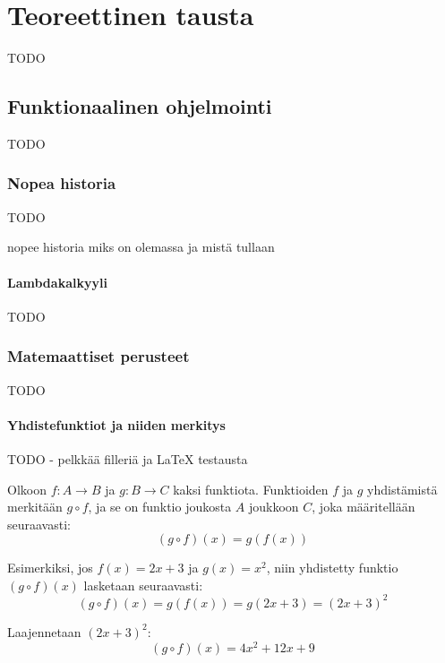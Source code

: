 \vspace{21.5pt} %
\chapter{Teoreettinen tausta}

TODO

\section{Funktionaalinen ohjelmointi}

TODO

\subsection{Nopea historia}

TODO

nopee historia miks on olemassa ja mistä tullaan

\subsubsection{Lambdakalkyyli}

TODO

\subsection{Matemaattiset perusteet}

TODO

\subsubsection{Yhdistefunktiot ja niiden merkitys}


TODO - pelkkää filleriä ja \LaTeX{} testausta

Olkoon \( f: A \rightarrow B \) ja \( g: B \rightarrow C \) kaksi funktiota. Funktioiden \( f \) ja \( g \) yhdistämistä merkitään \( g \circ f \), ja se on funktio joukosta \( A \) joukkoon \( C \), joka määritellään seuraavasti:
\[
  (g \circ f)(x) = g(f(x))
\]

Esimerkiksi, jos \( f(x) = 2x + 3 \) ja \( g(x) = x^2 \), niin yhdistetty funktio \( (g \circ f)(x) \) lasketaan seuraavasti:
\[
  (g \circ f)(x) = g(f(x)) = g(2x + 3) = (2x + 3)^2
\]

Laajennetaan \( (2x + 3)^2 \):
\[
  (g \circ f)(x) = 4x^2 + 12x + 9
\]


